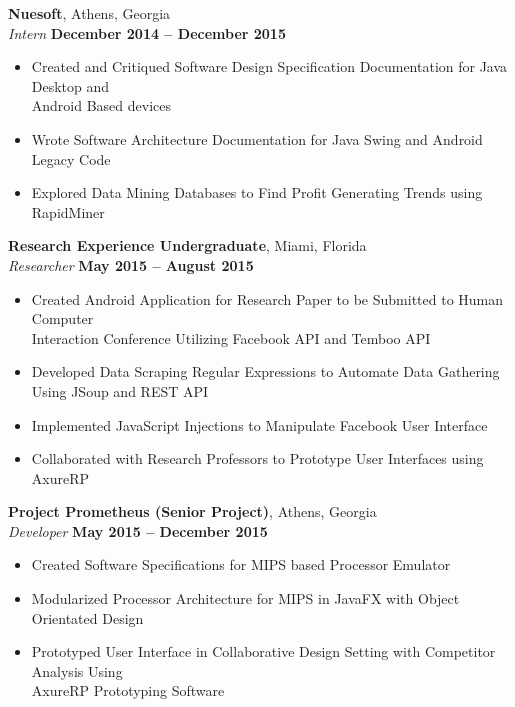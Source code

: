 \documentclass[margin,line]{resume}
\begin{document}
\begin{resume}
	\textbf{Nuesoft}, Athens, Georgia \vspace{1mm}\\\vspace{1mm}%
	\textsl{Intern} \hfill \textbf{December 2014 -- December 2015}
	\begin{itemize}
	  	\item Created and Critiqued Software Design Specification Documentation for Java Desktop and\\
	  	Android Based devices 
	  	\item Wrote Software Architecture Documentation for Java Swing and Android Legacy Code 
	  	\item Explored Data Mining Databases to Find Profit Generating Trends using RapidMiner
	\end{itemize}

	\textbf{Research Experience Undergraduate}, Miami, Florida \vspace{1mm}\\\vspace{1mm}%
	\textsl{Researcher} \hfill \textbf{May 2015 -- August 2015}
	\begin{itemize}
		\item Created Android Application for Research Paper to be Submitted to Human Computer\\
		Interaction Conference Utilizing Facebook API and Temboo API
		\item Developed Data Scraping Regular Expressions to Automate Data Gathering Using JSoup and REST API
		\item Implemented JavaScript Injections to Manipulate Facebook User Interface
		\item Collaborated with Research Professors to Prototype User Interfaces using AxureRP
	\end{itemize}
	
	\textbf{Project Prometheus (Senior Project)}, Athens, Georgia \vspace{1mm}\\\vspace{1mm}%
	\textsl{Developer} \hfill \textbf{May 2015 -- December 2015}
	\begin{itemize}
		\item Created Software Specifications for MIPS based Processor Emulator 
		\item Modularized Processor Architecture for MIPS in JavaFX with Object Orientated Design
		\item Prototyped User Interface in Collaborative Design Setting with Competitor Analysis Using \\
		AxureRP Prototyping Software  
	\end{itemize}
	

\end{resume}
\end{document}
